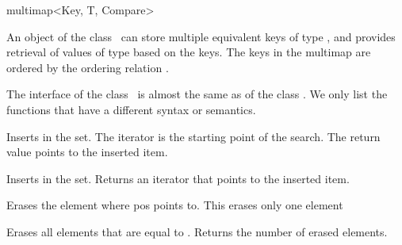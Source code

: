 
\ccHtmlNoClassLinks
\begin{ccClassTemplate} {multimap<Key, T, Compare>}


\ccDefinition
An object of the class \ccClassTemplateName\ can store multiple
equivalent keys of type , and provides retrieval of
values of type  based on the keys. The keys in the multimap
are ordered by the ordering relation .

The interface of the class \ccClassTemplateName\ is almost the same as of
the class . We only list the functions 
that have a different syntax or semantics.

\ccHtmlLinksOff
{}
\ccHtmlLinksOn

\ccTypes
{}




\ccOperations
{}
{Inserts  in the set. The iterator  is the starting 
 point of  the search.  The return value points to the inserted item.}

{Inserts  in the set. Returns an iterator that points to the 
 inserted item.}

{Erases the element where pos points to. This erases only one element}

{Erases all  elements that are equal to . Returns the number
 of erased elements.}

\end{ccClassTemplate} 
